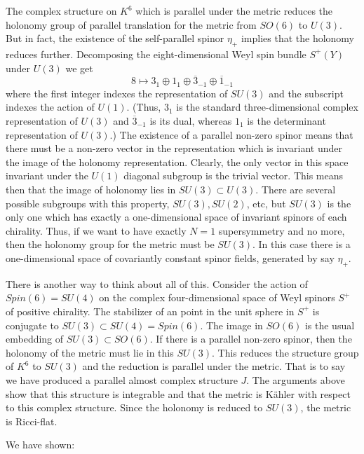 The complex structure on $K^6$ which is parallel under the metric
reduces the holonomy group of parallel translation for the metric from
$SO(6)$ to $U(3)$. But in fact, the existence of the self-parallel
spinor $\eta_+$ implies that the holonomy reduces further.
Decomposing the eight-dimensional Weyl spin bundle $S^+(Y)$ under
$U(3)$ we  get
$$8\mapsto 3_1\oplus 1_1\oplus \overline{3}_{-1}\oplus \overline{1}_{-1}$$
where the first integer indexes the representation of $SU(3)$ and the
subscript indexes the action of $U(1)$. (Thus, $3_1$ is the standard
three-dimensional complex representation of $U(3)$ and
$\overline{3}_{-1}$ is its dual, whereas $1_1$ is the determinant
representation of $U(3)$.) The existence of a parallel non-zero spinor
means that there must be a non-zero vector in the representation which
is invariant under the image of the holonomy representation. 
Clearly, the only vector in this space invariant under the $U(1)$
diagonal subgroup is the trivial vector.
 This means then that the image of holonomy lies in $SU(3)\subset U(3)$.
There are several possible subgroups with this property, $SU(3), SU(2)$,
etc, but $SU(3)$ is the only one which has exactly a one-dimensional
space of invariant spinors of each chirality.  Thus, if we want to
have exactly $N=1$ supersymmetry and no more, then the holonomy group
for the metric must be $SU(3)$. In this case there is a
one-dimensional space of covariantly constant spinor fields, generated
by say $\eta_+$.

There is another way to think about all of this.  Consider the action
of $Spin(6)=SU(4)$ on the complex four-dimensional space of Weyl spinors
$S^+$ of positive chirality. 
The stabilizer of an point in the unit sphere in $S^+$ is 
conjugate to $SU(3)\subset SU(4)=Spin(6)$. The image in $SO(6)$ is the
usual embedding of  $SU(3)\subset SO(6)$.
If there is a parallel non-zero spinor, then the
holonomy of the metric must lie in this $SU(3)$. 
This reduces the structure group of $K^6$ to $SU(3)$ and the reduction
is parallel under the metric. That is to say we have produced a parallel almost
complex structure $J$.  The arguments above show that this structure
is integrable and that the metric is K\"ahler with respect to this
complex structure.  Since the holonomy is reduced to $SU(3)$, the
metric is Ricci-flat. 


We have shown:

\smallskip
{}

